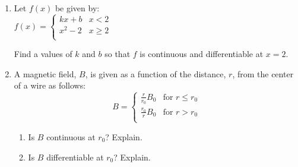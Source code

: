 \documentclass[12pt]{article}
\begin{document}
\begin{enumerate}
\newpage
~

\item Let $f(x)$ be given by:\\
	$f(x) = \begin{cases} 
				
     				 kx+b & x<2 \\
     				 x^2-2 & x \geq 2 \\
  				\end{cases} $	

Find a values of $k$ and $b$ so that $f$ is continuous and differentiable at $x=2$.

	\vfill



\item A magnetic field, $B$, is given as a function of the distance, $r$, from the center of a wire as follows:
	\[B= \begin{cases} 
     				 \frac{r}{r_0}B_0&\text{for }r\leq r_0 \\
     				 \frac{r_0}{r}B_0&\text{for }r> r_0 \\
  				\end{cases} \]
	\begin{enumerate}
	\item Is $B$ continuous at $r_0$? Explain.
	\vfill
	\item Is $B$ differentiable at $r_0$? Explain.
	\vfill
	\end{enumerate}



\end{enumerate}
\end{document}
